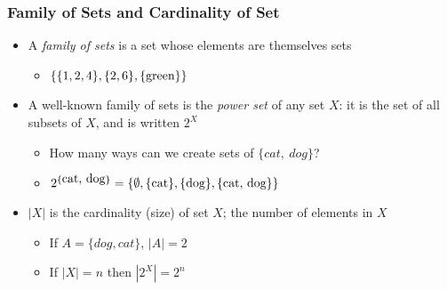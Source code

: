 \documentclass[aspectratio=169]{beamer}
\newtheorem{defn}{Definition}
\numberwithin{equation}{section}
\begin{document}
\begin{frame}
\frametitle{Family of Sets and Cardinality of Set}

\begin{itemize}
\item A \textit{family of sets} is a set whose elements are themselves sets
\begin{itemize}
\item $\{\{1, 2, 4\}, \{2, 6\}, \{\hbox{green}\}\}$ \pause
\end{itemize}
\end{itemize}

\begin{itemize}
\item A well-known family of sets is the \textit{power set} of any set $X$: it is the set of all subsets of $X$, and is written $2^X$ 
\begin{itemize}
\item How many ways can we create sets of $\{cat,\ dog\}$? \pause
\item $2^{\{\hbox{cat, dog}\}}=\{\emptyset, \{\hbox{cat}\}, \{\hbox{dog}\}, \{\hbox{cat, dog}\}\}$ \pause
\end{itemize}
\end{itemize}

\begin{itemize}
\item $|X|$ is the cardinality (size) of set $X$; the number of elements in $X$
\begin{itemize}
\item If $A = \{dog, cat\}$, $|A| =2 $\pause
\item If $|X|=n$ then $|2^X|=2^n$
\end{itemize}
\end{itemize}

\end{frame}





\end{document}
